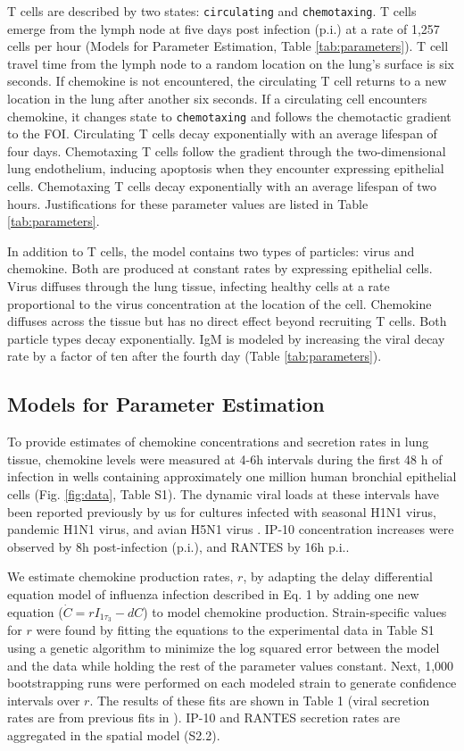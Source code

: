 \documentclass[preprint,10pt,authoryear]{elsarticle}
\begin{document}
T cells are described by two states: \texttt{circulating} and \texttt{chemotaxing}.    T cells emerge from the lymph node at five days post infection (p.i.) at a rate of 1,257 cells per hour (Models for Parameter Estimation, Table \ref{tab:parameters}). T cell travel time from the lymph node to a random location on the lung's surface is six seconds.  If chemokine is not encountered, the circulating T cell returns to a new location in the lung after another six seconds.  If a circulating cell encounters chemokine, it changes state to \texttt{chemotaxing} and follows the chemotactic gradient to the FOI. Circulating T cells decay exponentially with an average lifespan of four days.  Chemotaxing T cells follow the gradient through the two-dimensional lung endothelium, inducing apoptosis when they encounter expressing epithelial cells. Chemotaxing T cells decay exponentially with an average lifespan of two hours.  Justifications for these parameter values are listed in Table \ref{tab:parameters}.

In addition to T cells, the model contains two types of particles: virus and chemokine. Both are produced at constant rates by expressing epithelial cells.  Virus diffuses through the lung tissue, infecting healthy cells at a rate proportional to the virus concentration at the location of the cell. Chemokine diffuses across the tissue but has no direct effect beyond recruiting T cells. Both particle types decay exponentially.  IgM is modeled by increasing the viral decay rate by a factor of ten after the fourth day (Table \ref{tab:parameters}).

\subsection*{Models for Parameter Estimation}

To provide estimates of chemokine concentrations and secretion rates in lung tissue, chemokine levels were measured at 4-6h intervals during the first 48 h of infection in wells containing approximately one million human bronchial epithelial cells (Fig. \ref{fig:data}, Table S1).  The dynamic viral loads at these intervals have been reported previously by us for cultures infected with seasonal H1N1 virus, pandemic H1N1 virus, and avian H5N1 virus \citep{Mitchell2011}.  IP-10 concentration increases were observed by 8h post-infection (p.i.), and RANTES by 16h p.i..

We estimate chemokine production rates, $r$, by adapting the delay differential equation model of influenza infection described in \citep{Mitchell2011} Eq. 1 by adding one new equation ($\dot{C}=r I_{1 \tau_3}-dC$) to model chemokine production.   Strain-specific values for $r$ were found by fitting the equations to the experimental data in Table S1 using a genetic algorithm to minimize the log squared error between the model and the data while holding the rest of the parameter values constant.  Next, 1,000 bootstrapping runs were performed on each modeled strain to generate confidence intervals over $r$.  The results of these fits are shown in Table 1 (viral secretion rates are from previous fits in \cite{Mitchell2011}).  IP-10 and RANTES secretion rates are aggregated in the spatial model (S2.2).
\end{document}
